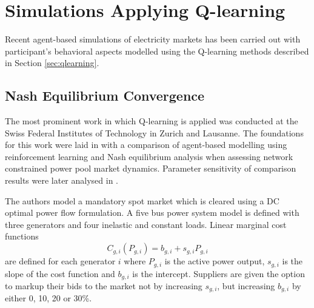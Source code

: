 \section{Simulations Applying Q-learning}
%
Recent agent-based simulations of electricity markets has been carried out
with participant's behavioral aspects modelled using the Q-learning methods
described in Section \ref{sec:qlearning}.

\subsection{Nash Equilibrium Convergence}
The most prominent work in which Q-learning is applied was conducted
at the Swiss Federal Institutes of Technology in Zurich and Lausanne. The
foundations for this work were laid in  with a comparison
of agent-based modelling using reinforcement learning and Nash equilibrium
analysis when assessing network constrained power pool market dynamics.
Parameter sensitivity of comparison results were later analysed in
.

The authors model a mandatory spot market which is cleared using a DC
optimal power flow formulation.  A five bus power system model is defined with
three generators and four inelastic and constant loads.  Linear marginal cost
functions
\begin{equation}
C_{g,i}(P_{g,i}) = b_{g,i} + s_{g,i}P_{g,i}
\end{equation}
are defined for each generator $i$ where $P_{g,i}$ is the active power output,
$s_{g,i}$ is the slope of the cost function and $b_{g,i}$ is the intercept.
Suppliers are given the option to markup their bids to the market not by increasing $s_{g,i}$, but increasing $b_{g,i}$ by either 0,
10, 20 or 30\%.

